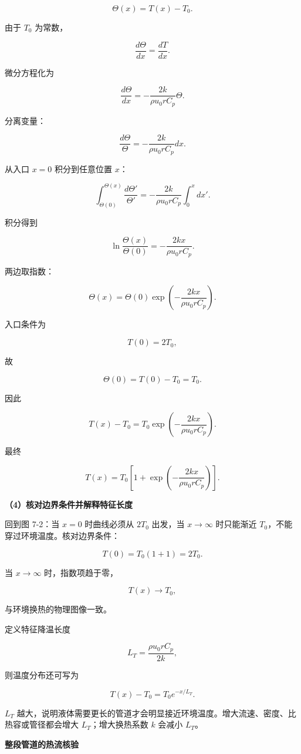 \documentclass[12pt,a4paper,UTF8]{ctexart}
\begin{document}
\[\Theta(x)=T(x)-T_0.\]

由于 \(T_0\) 为常数，

\[\frac{d\Theta}{dx}=\frac{dT}{dx}.\]

微分方程化为

\[\frac{d\Theta}{dx}
=-\frac{2k}{\rho u_0rC_p}\Theta.\]

分离变量：

\[\frac{d\Theta}{\Theta}
=-\frac{2k}{\rho u_0rC_p}dx.\]

从入口 \(x=0\) 积分到任意位置 \(x\)：

\[\int_{\Theta(0)}^{\Theta(x)}
\frac{d\Theta'}{\Theta'}
=-\frac{2k}{\rho u_0rC_p}
\int_0^x dx'.\]

积分得到

\[\ln\frac{\Theta(x)}{\Theta(0)}
=-\frac{2kx}{\rho u_0rC_p}.\]

两边取指数：

\[\Theta(x)
=\Theta(0)
\exp\left(
-\frac{2kx}{\rho u_0rC_p}
\right).\]

入口条件为

\[T(0)=2T_0,\]

故

\[\Theta(0)=T(0)-T_0=T_0.\]

因此

\[T(x)-T_0
=T_0
\exp\left(
-\frac{2kx}{\rho u_0rC_p}
\right).\]

最终

\[\boxed{
T(x)=T_0
\left[
1+\exp\left(
-\frac{2kx}{\rho u_0rC_p}
\right)
\right]
}.\]

\textbf{（4）核对边界条件并解释特征长度}

回到图 7-2：当 \(x=0\) 时曲线必须从 \(2T_0\) 出发，当 \(x\to\infty\)
时只能渐近 \(T_0\)，不能穿过环境温度。核对边界条件：

\[T(0)=T_0(1+1)=2T_0.\]

当 \(x\to\infty\) 时，指数项趋于零，

\[T(x)\to T_0,\]

与环境换热的物理图像一致。

定义特征降温长度

\[L_T=\frac{\rho u_0rC_p}{2k},\]

则温度分布还可写为

\[T(x)-T_0=T_0e^{-x/L_T}.\]

\(L_T\)
越大，说明液体需要更长的管道才会明显接近环境温度。增大流速、密度、比热容或管径都会增大
\(L_T\)；增大换热系数 \(k\) 会减小 \(L_T\)。

\textbf{整段管道的热流核验}
\end{document}
